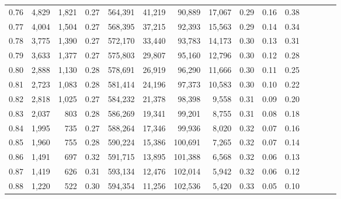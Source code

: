 \begin{tabular}{rrrcrrrrrrrrrrr}
0.76 &   4,829 &  1,821 &                                       0.27 &  564,391 &   41,219 &   90,889 &   17,067 &  0.29 &  0.16 &                         0.38 \\
0.77 &   4,004 &  1,504 &                                       0.27 &  568,395 &   37,215 &   92,393 &   15,563 &  0.29 &  0.14 &                         0.34 \\
0.78 &   3,775 &  1,390 &                                       0.27 &  572,170 &   33,440 &   93,783 &   14,173 &  0.30 &  0.13 &                         0.31 \\
0.79 &   3,633 &  1,377 &                                       0.27 &  575,803 &   29,807 &   95,160 &   12,796 &  0.30 &  0.12 &                         0.28 \\
0.80 &   2,888 &  1,130 &                                       0.28 &  578,691 &   26,919 &   96,290 &   11,666 &  0.30 &  0.11 &                         0.25 \\
0.81 &   2,723 &  1,083 &                                       0.28 &  581,414 &   24,196 &   97,373 &   10,583 &  0.30 &  0.10 &                         0.22 \\
0.82 &   2,818 &  1,025 &                                       0.27 &  584,232 &   21,378 &   98,398 &    9,558 &  0.31 &  0.09 &                         0.20 \\
0.83 &   2,037 &    803 &                                       0.28 &  586,269 &   19,341 &   99,201 &    8,755 &  0.31 &  0.08 &                         0.18 \\
0.84 &   1,995 &    735 &                                       0.27 &  588,264 &   17,346 &   99,936 &    8,020 &  0.32 &  0.07 &                         0.16 \\
0.85 &   1,960 &    755 &                                       0.28 &  590,224 &   15,386 &  100,691 &    7,265 &  0.32 &  0.07 &                         0.14 \\
0.86 &   1,491 &    697 &                                       0.32 &  591,715 &   13,895 &  101,388 &    6,568 &  0.32 &  0.06 &                         0.13 \\
0.87 &   1,419 &    626 &                                       0.31 &  593,134 &   12,476 &  102,014 &    5,942 &  0.32 &  0.06 &                         0.12 \\
0.88 &   1,220 &    522 &                                       0.30 &  594,354 &   11,256 &  102,536 &    5,420 &  0.33 &  0.05 &                         0.10 \\

\end{tabular}
